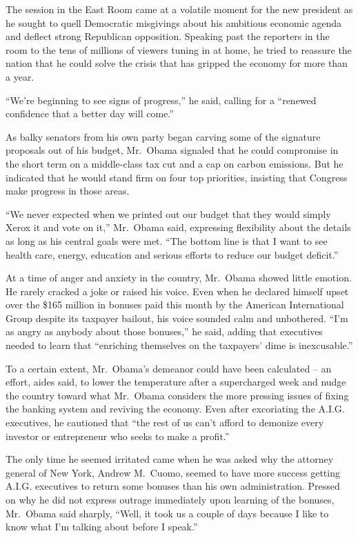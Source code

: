 \documentclass[12pt,a4paper,onecolumn]{article}
\begin{document}
\begin{CJK*}{GBK}{song}
The session in the East Room came at a volatile moment for the new president as he sought to quell
Democratic misgivings about his ambitious economic agenda and deflect strong Republican opposition.
Speaking past the reporters in the room to the tens of millions of viewers tuning in at home, he
tried to reassure the nation that he could solve the crisis that has gripped the economy for more
than a year.

``We're beginning to see signs of progress,'' he said, calling for a ``renewed confidence that a
better day will come.''

As balky senators from his own party began carving some of the signature proposals out of his
budget, Mr.~Obama signaled that he could compromise in the short term on a middle-class tax cut and
a cap on carbon emissions. But he indicated that he would stand firm on four top priorities,
insisting that Congress make progress in those areas.

``We never expected when we printed out our budget that they would simply Xerox it and vote on it,''
Mr.~Obama said, expressing flexibility about the details as long as his central goals were met.
``The bottom line is that I want to see health care, energy, education and serious efforts to reduce
our budget deficit.''

At a time of anger and anxiety in the country, Mr.~Obama showed little emotion. He rarely cracked a
joke or raised his voice. Even when he declared himself upset over the \$165 million in bonuses paid
this month by the American International Group despite its taxpayer bailout, his voice sounded calm
and unbothered. ``I'm as angry as anybody about those bonuses,'' he said, adding that executives
needed to learn that ``enriching themselves on the taxpayers' dime is inexcusable.''

To a certain extent, Mr.~Obama's demeanor could have been calculated -- an effort, aides said, to
lower the temperature after a supercharged week and nudge the country toward what Mr.~Obama
considers the more pressing issues of fixing the banking system and reviving the economy. Even after
excoriating the A.I.G. executives, he cautioned that ``the rest of us can't afford to demonize every
investor or entrepreneur who seeks to make a profit.''

The only time he seemed irritated came when he was asked why the attorney general of New York,
Andrew M.~Cuomo, seemed to have more success getting A.I.G. executives to return some bonuses than
his own administration. Pressed on why he did not express outrage immediately upon learning of the
bonuses, Mr.~Obama said sharply, ``Well, it took us a couple of days because I like to know what I'm
talking about before I speak.''


\end{CJK*}
\end{document}

